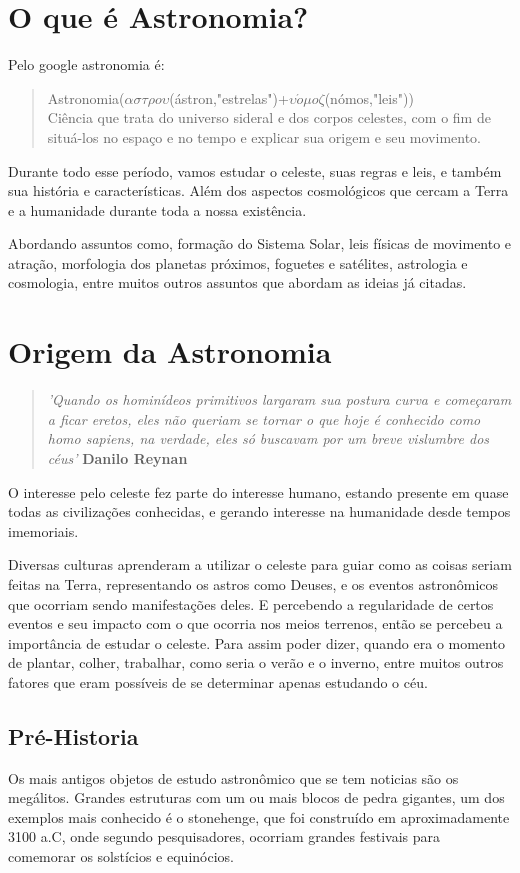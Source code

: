 
\section{O que é Astronomia?}
Pelo google astronomia é:
\begin{quote}
Astronomia($\alpha \sigma \tau \rho o\upsilon $(ástron,"estrelas")+$\upsilon \acute{o} \mu o \zeta$(nómos,"leis"))\\
Ciência que trata do universo sideral e dos corpos celestes, com o fim de situá-los no espaço e no tempo e explicar sua origem e seu movimento.
\end{quote}
Durante todo esse período, vamos estudar o celeste, suas regras e leis, e também sua história e características. Além dos aspectos cosmológicos que cercam a Terra e a humanidade durante toda a nossa existência.
 
Abordando assuntos como, formação do Sistema Solar, leis físicas de movimento e atração, morfologia dos planetas próximos, foguetes e satélites, astrologia e cosmologia, entre muitos outros assuntos que abordam as ideias já citadas.
\section{Origem da Astronomia}
\begin{quote}
{\large\it 'Quando os hominídeos primitivos largaram sua postura curva e começaram a ficar eretos, eles não queriam se tornar o que hoje é conhecido como homo sapiens, na verdade, eles só buscavam por um breve vislumbre dos céus'}   {\bf Danilo Reynan}
\end{quote}
O interesse pelo celeste fez parte do interesse humano, estando presente em quase todas as civilizações conhecidas, e gerando interesse na humanidade desde tempos imemoriais.

Diversas culturas aprenderam a utilizar o celeste para guiar como as coisas seriam feitas na Terra, representando os astros como Deuses, e os eventos astronômicos que ocorriam sendo manifestações deles. E percebendo a regularidade de certos eventos e seu impacto com o que ocorria nos meios terrenos, então se percebeu a importância de estudar o celeste. Para assim poder dizer, quando era o momento de plantar, colher, trabalhar, como seria o verão e o inverno, entre muitos outros fatores que eram possíveis de se determinar apenas estudando o céu.
\subsection*{Pré-Historia}
Os mais antigos objetos de estudo astronômico que se tem noticias são os megálitos. Grandes estruturas com um ou mais blocos de pedra gigantes, um dos exemplos mais conhecido é o stonehenge, que foi construído em aproximadamente 3100 a.C, onde segundo pesquisadores, ocorriam grandes festivais para comemorar os solstícios e equinócios.

